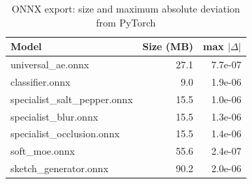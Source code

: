 \begin{table}[t]
\centering
\caption{ONNX export: size and maximum absolute deviation from PyTorch}
\label{tab:onnx}
\begin{tabular}{lrr}
\toprule
Model & Size (MB) & max $|\Delta|$ \\
\midrule
universal\_ae.onnx & 27.1 & 7.7e-07 \\
classifier.onnx & 9.0 & 1.9e-06 \\
specialist\_salt\_pepper.onnx & 15.5 & 1.0e-06 \\
specialist\_blur.onnx & 15.5 & 1.3e-06 \\
specialist\_occlusion.onnx & 15.5 & 1.4e-06 \\
soft\_moe.onnx & 55.6 & 2.4e-07 \\
sketch\_generator.onnx & 90.2 & 2.0e-06 \\
\bottomrule
\end{tabular}
\end{table}
